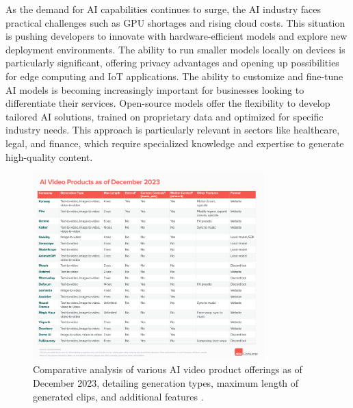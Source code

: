 \documentclass[11pt,a4paper,oneside]{report}
\begin{document}
As the demand for AI capabilities continues to surge, the AI industry faces practical challenges such as GPU shortages and rising cloud costs. 
This situation is pushing developers to innovate with hardware-efficient models and explore new deployment environments.
The ability to run smaller models locally on devices is particularly significant, offering privacy advantages and opening up possibilities for edge computing and IoT applications. 
The ability to customize and fine-tune AI models is becoming increasingly important for businesses looking to differentiate their services. 
Open-source models offer the flexibility to develop tailored AI solutions, trained on proprietary data and optimized for specific industry needs. 
This approach is particularly relevant in sectors like healthcare, legal, and finance, which require specialized knowledge and expertise to generate high-quality content.

\begin{figure}[htbp]
  \centering
  \includegraphics[width=0.8\textwidth]{products.png}
  \caption{Comparative analysis of various AI video product offerings as of December 2023, detailing generation types, maximum length of generated clips, and additional features \cite{a16zAI2023}.}
\end{figure}
\end{document}
